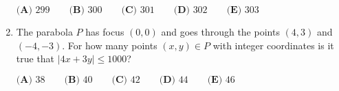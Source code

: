 \documentclass{article}
\begin{document}
\begin{enumerate}[label=\arabic*., itemsep=0.5em]
\(\textbf{(A) }299\qquad
\textbf{(B) }300\qquad
\textbf{(C) }301\qquad
\textbf{(D) }302\qquad
\textbf{(E) }303\qquad\)\par \vspace{0.5em}\item The parabola \(P\) has focus \((0,0)\) and goes through the points \((4,3)\) and \((-4,-3)\).  For how many points \((x,y)\in P\) with integer coordinates is it true that \(|4x+3y|\leq 1000\)?

\(\textbf{(A) }38\qquad
\textbf{(B) }40\qquad
\textbf{(C) }42\qquad
\textbf{(D) }44\qquad
\textbf{(E) }46\qquad\)\par \vspace{0.5em}\end{enumerate}
\end{document}
